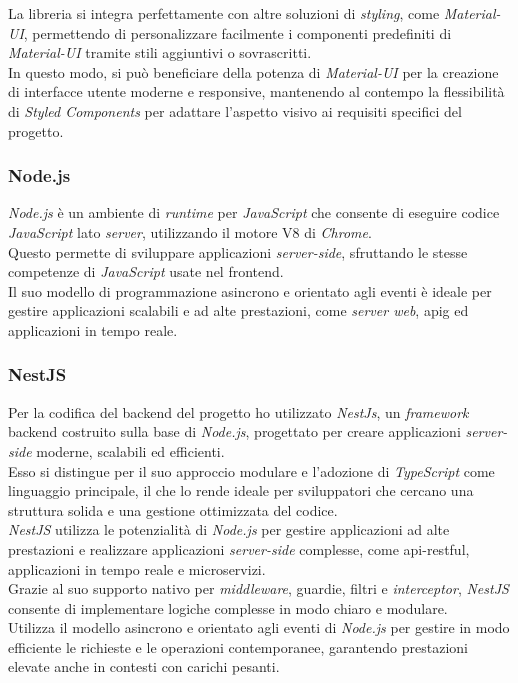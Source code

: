 \noindent La libreria si integra perfettamente con altre soluzioni di \textit{styling}, come \textit{Material-UI}, permettendo di personalizzare facilmente i componenti predefiniti di \textit{Material-UI} tramite stili aggiuntivi o sovrascritti. \\
In questo modo, si può beneficiare della potenza di \textit{Material-UI} per la creazione di interfacce utente moderne e responsive, mantenendo al contempo la flessibilità di \textit{Styled Components} per adattare l’aspetto visivo ai requisiti specifici del progetto. 

\subsubsection{Node.js}

\textit{Node.js} è un ambiente di \textit{runtime} per \textit{JavaScript} che consente di eseguire codice \textit{JavaScript} lato \textit{server}, utilizzando il motore V8 di \textit{Chrome}. \\
Questo permette di sviluppare applicazioni \textit{server-side}, sfruttando le stesse competenze di \textit{JavaScript} usate nel \gls{frontend}. \\
Il suo modello di programmazione asincrono e orientato agli eventi è ideale per gestire applicazioni scalabili e ad alte prestazioni, come \textit{server web}, \gls{apig} ed applicazioni in tempo reale.

\subsubsection{NestJS}

\noindent Per la codifica del \gls{backend} del progetto ho utilizzato \textit{NestJs}, un \textit{framework} \gls{backend} costruito sulla base di \textit{Node.js}, progettato per creare applicazioni \textit{server-side} moderne, scalabili ed efficienti.\\
Esso si distingue per il suo approccio modulare e l'adozione di \textit{TypeScript} come linguaggio principale, il che lo rende ideale per sviluppatori che cercano una struttura solida e una gestione ottimizzata del codice.\\
\textit{NestJS} utilizza le potenzialità di \textit{Node.js} per gestire applicazioni ad alte prestazioni e realizzare applicazioni \textit{server-side} complesse, come \gls{api-restful}, applicazioni in tempo reale e microservizi.\\

\noindent Grazie al suo supporto nativo per \textit{middleware}, guardie, filtri e \textit{interceptor}, \textit{NestJS} consente di implementare logiche complesse in modo chiaro e modulare.\\
Utilizza il modello asincrono e orientato agli eventi di \textit{Node.js} per gestire in modo efficiente le richieste e le operazioni contemporanee, garantendo prestazioni elevate anche in contesti con carichi pesanti.\\


